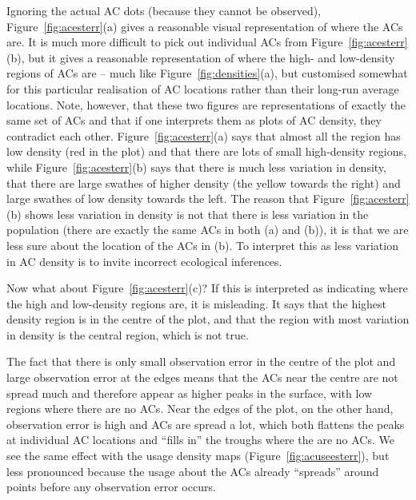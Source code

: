 \documentclass[10pt,a4paper]{article}
\begin{document}
Ignoring the actual AC dots (because they cannot be observed), Figure~\ref{fig:acesterr}(a) gives a reasonable visual representation of where the ACs are. It is much more difficult to pick out individual ACs from Figure~\ref{fig:acesterr}(b), but it gives a reasonable representation of where the high- and low-density regions of ACs are -- much like Figure~\ref{fig:densities}(a), but customised somewhat for this particular realisation of AC locations rather than their long-run average locations. Note, however, that these two figures are representations of exactly the same set of ACs and that if one interprets them as plots of AC density, they contradict each other. Figure~\ref{fig:acesterr}(a) says that almost all the region has low density (red in the plot) and that there are lots of small high-density regions, while Figure~\ref{fig:acesterr}(b) says that there is much less variation in density, that there are large swathes of higher density (the yellow towards the right) and large swathes of low density towards the left. The reason that Figure~\ref{fig:acesterr}(b) shows less variation in density is not that there is less variation in the population (there are exactly the same ACs in both (a) and (b)), it is that we are less sure about the location of the ACs in (b). To interpret this as less variation in AC density is to invite incorrect ecological inferences.

Now what about Figure~\ref{fig:acesterr}(c)? If this is interpreted as indicating where the high and low-density regions are, it is misleading. It says that the highest density region is in the centre of the plot, and that the region with most variation in density is the central region, which is not true. 

The fact that there is only small observation error in the centre of the plot and large observation error at the edges means that the ACs near the centre are not spread much and therefore appear as higher peaks in the surface, with low regions where there are no ACs. Near the edges of the plot, on the other hand, observation error is high and ACs are spread a lot, which both flattens the peaks at individual AC locations and ``fills in'' the troughs where the are no ACs. We see the same effect with the usage density maps (Figure~\ref{fig:acuseesterr}), but less pronounced because the usage about the ACs already ``spreads'' around points before any observation error occurs.
\end{document}
